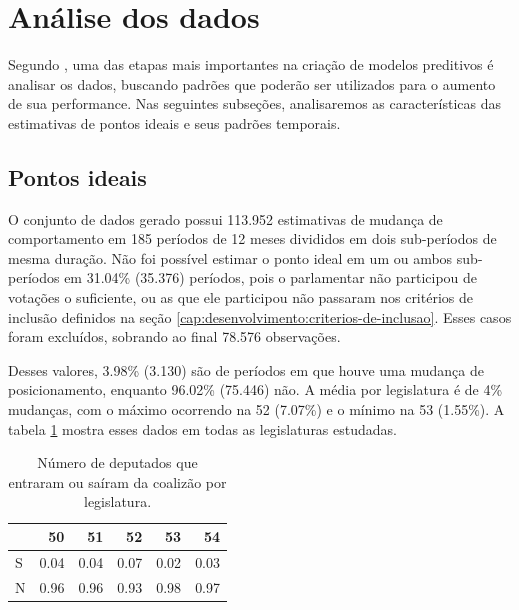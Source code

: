 \documentclass[a4paper,titlepage]{ppgi}\usepackage[]{graphicx}\usepackage[]{color}
\newenvironment{knitrout}{}{} %
\begin{document}
\section{Análise dos dados}
\label{cap:desenvolvimento:analise}

Segundo , uma das etapas mais importantes na criação de
modelos preditivos é analisar os dados, buscando padrões que poderão ser
utilizados para o aumento de sua performance. Nas seguintes subseções,
analisaremos as características das estimativas de pontos ideais e seus padrões
temporais.

\subsection{Pontos ideais}



O conjunto de dados gerado possui 113.952 estimativas de mudança
de comportamento em 185 períodos de 12 meses divididos em dois
sub-períodos de mesma duração. Não foi possível estimar o ponto ideal em um ou
ambos sub-períodos em 31.04\%
(35.376) períodos, pois o parlamentar não participou de
votações o suficiente, ou as que ele participou não passaram nos critérios de
inclusão definidos na seção \ref{cap:desenvolvimento:criterios-de-inclusao}. Esses casos
foram excluídos, sobrando ao final 78.576 observações.

Desses valores, 3.98\%
(3.130) são de períodos em que houve uma mudança de
posicionamento, enquanto 96.02\% (75.446) não. A média por legislatura é de
4\% mudanças,
com o máximo ocorrendo na 52\textordfeminine{}
(7.07\%) e o
mínimo na 53\textordfeminine{}
(1.55\%).  A
tabela \ref{table:coalition-changes-per-legislature} mostra esses dados em
todas as legislaturas estudadas.

\begin{table}
\centering
\begin{knitrout}
\color{fgcolor}
\begin{tabular}{l|r|r|r|r|r}
\hline
  & 50 & 51 & 52 & 53 & 54\\
\hline
S & 0.04 & 0.04 & 0.07 & 0.02 & 0.03\\
\hline
N & 0.96 & 0.96 & 0.93 & 0.98 & 0.97\\
\hline
\end{tabular}


\end{knitrout}
\caption{Número de deputados que entraram ou saíram da coalizão por legislatura.}
\label{table:coalition-changes-per-legislature}
\end{table}
\end{document}
